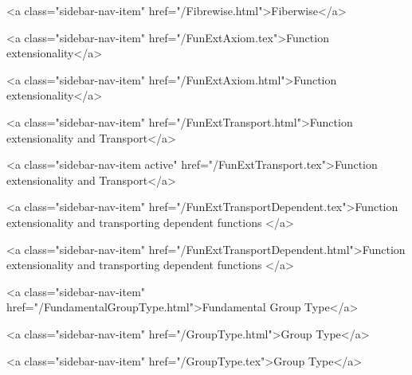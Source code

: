       
    
      
        
          <a class="sidebar-nav-item" href="/Fibrewise.html">Fiberwise</a>
        
      
    
      
        
          <a class="sidebar-nav-item" href="/FunExtAxiom.tex">Function extensionality</a>
        
      
    
      
        
          <a class="sidebar-nav-item" href="/FunExtAxiom.html">Function extensionality</a>
        
      
    
      
        
          <a class="sidebar-nav-item" href="/FunExtTransport.html">Function extensionality and Transport</a>
        
      
    
      
        
          <a class="sidebar-nav-item active" href="/FunExtTransport.tex">Function extensionality and Transport</a>
        
      
    
      
        
          <a class="sidebar-nav-item" href="/FunExtTransportDependent.tex">Function extensionality and transporting dependent functions </a>
        
      
    
      
        
          <a class="sidebar-nav-item" href="/FunExtTransportDependent.html">Function extensionality and transporting dependent functions </a>
        
      
    
      
        
          <a class="sidebar-nav-item" href="/FundamentalGroupType.html">Fundamental Group Type</a>
        
      
    
      
        
          <a class="sidebar-nav-item" href="/GroupType.html">Group Type</a>
        
      
    
      
        
          <a class="sidebar-nav-item" href="/GroupType.tex">Group Type</a>
        
      
    
